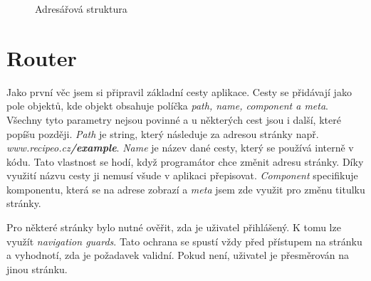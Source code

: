 \begin{figure}
    \caption{Adresářová struktura} \label{fig:struktura}
\end{figure}

\section{Router}
Jako první věc jsem si připravil základní cesty aplikace. Cesty se přidávají jako pole objektů, kde objekt obsahuje políčka \emph{path, name, component \emph{a} meta}.
Všechny tyto parametry nejsou povinné a u některých cest jsou i další, které popíšu později. \emph{Path} je string, který následuje za adresou stránky např.
\emph{www.recipeo.cz\textbf{/example}}. \emph{Name} je název dané cesty, který se používá interně v kódu. Tato vlastnost se hodí, když programátor chce změnit adresu stránky.
Díky využití názvu cesty ji nemusí všude v aplikaci přepisovat. \emph{Component} specifikuje komponentu, která se na adrese zobrazí a \emph{meta} jsem zde využit pro změnu
titulku stránky.

Pro některé stránky bylo nutné ověřit, zda je uživatel přihlášený. K tomu lze využít \emph{navigation guards}. Tato ochrana se spustí
vždy před přístupem na stránku a vyhodnotí, zda je požadavek validní. Pokud není, uživatel je přesměrován na jinou stránku.

